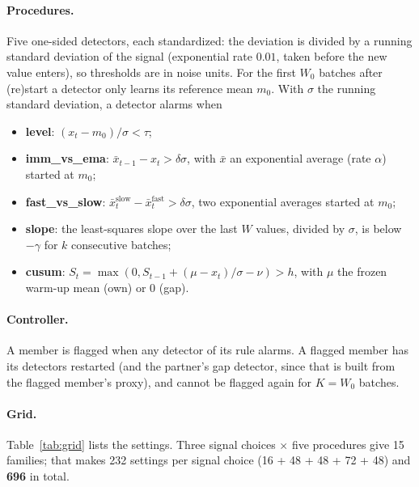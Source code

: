 \documentclass[10pt]{article}
\begin{document}
\paragraph{Procedures.} Five one-sided detectors, each standardized: the deviation is divided by a running standard deviation of the signal (exponential rate $0.01$, taken before the new value enters), so thresholds are in noise units. For the first $W_0$ batches after (re)start a detector only learns its reference mean $m_0$. With $\sigma$ the running standard deviation, a detector alarms when
\begin{itemize}
  \item \textbf{level}: $(x_t - m_0)/\sigma < \tau$;
  \item \textbf{imm\_vs\_ema}: $\bar x_{t-1} - x_t > \delta\sigma$, with $\bar x$ an exponential average (rate $\alpha$) started at $m_0$;
  \item \textbf{fast\_vs\_slow}: $\bar x^{\text{slow}}_t - \bar x^{\text{fast}}_t > \delta\sigma$, two exponential averages started at $m_0$;
  \item \textbf{slope}: the least-squares slope over the last $W$ values, divided by $\sigma$, is below $-\gamma$ for $k$ consecutive batches;
  \item \textbf{cusum}: $S_t = \max(0, S_{t-1} + (\mu - x_t)/\sigma - \nu) > h$, with $\mu$ the frozen warm-up mean (own) or $0$ (gap).
\end{itemize}
\paragraph{Controller.} A member is flagged when any detector of its rule alarms. A flagged member has its detectors restarted (and the partner's gap detector, since that is built from the flagged member's proxy), and cannot be flagged again for $K = W_0$ batches.

\paragraph{Grid.} Table~\ref{tab:grid} lists the settings. Three signal choices $\times$ five procedures give 15 families; that makes 232 settings per signal choice (16 + 48 + 48 + 72 + 48) and \textbf{696} in total.
\end{document}

